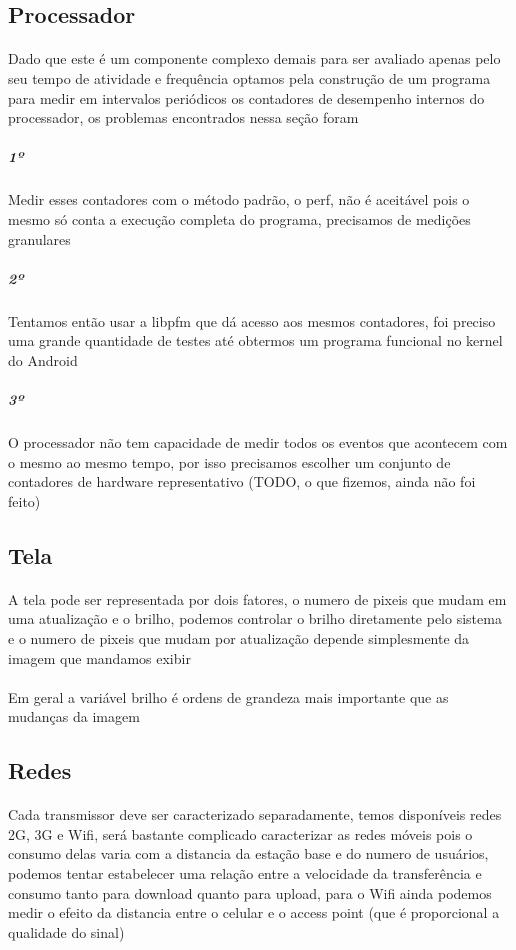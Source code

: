 \documentclass[11pt,a4paper,titlepage]{article}
\begin{document}
\subsection{Processador}
\paragraph{} Dado que este é um componente complexo demais para ser avaliado apenas pelo seu tempo de atividade e frequência optamos pela construção de um programa para medir em intervalos periódicos os contadores de desempenho internos do processador, os problemas encontrados nessa seção foram
\subparagraph*{1º} Medir esses contadores com o método padrão, o perf, não é aceitável pois o mesmo só conta a execução completa do programa, precisamos de medições granulares
\subparagraph{2º} Tentamos então usar a libpfm que dá acesso aos mesmos contadores, foi preciso uma grande quantidade de testes até obtermos um programa funcional no kernel do Android
\subparagraph{3º} O processador não tem capacidade de medir todos os eventos que acontecem com o mesmo ao mesmo tempo, por isso precisamos escolher um conjunto de contadores de hardware representativo (TODO, o que fizemos, ainda não foi feito)
\subsection{Tela}
\paragraph{} A tela pode ser representada por dois fatores, o numero de pixeis que mudam em uma atualização e o brilho, podemos controlar o brilho diretamente pelo sistema e o numero de pixeis que mudam por atualização depende simplesmente da imagem que mandamos exibir
\paragraph{} Em geral a variável brilho é ordens de grandeza mais importante que as mudanças da imagem
\subsection{Redes}
\paragraph{} Cada transmissor deve ser caracterizado separadamente, temos disponíveis redes 2G, 3G e Wifi, será bastante complicado caracterizar as redes móveis pois o consumo delas varia com a distancia da estação base e do numero de usuários, podemos tentar estabelecer uma relação entre a velocidade da transferência e consumo tanto para download quanto para upload, para o Wifi ainda podemos medir o efeito da distancia entre o celular e o access point (que é proporcional a qualidade do sinal) 
\end{document}
